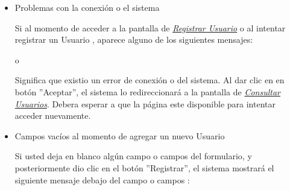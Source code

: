                 \begin{itemize}
                    \item Problemas con la conexión o el sistema
                
                        Si al momento de acceder a la pantalla de \hyperlink{registrarUs}{\textit{Registrar Usuario}} o al intentar registrar un Usuario , aparece alguno de los siguientes mensajes:
                        
                        o 
                    
                        Significa que existio un error de conexión o del sistema. Al dar clic en en botón ''Aceptar'', el sistema lo redireccionará a la pantalla de \hyperlink{consultaUs}{\textit{Consultar Usuarios}}. Debera esperar a que la página este disponible para  intentar acceder nuevamente.
                    
                    \item Campos vacíos al momento de agregar un nuevo Usuario
                
                        Si usted deja en blanco algún campo o campos del formulario, y posteriormente dio clic en el botón ''Registrar'', el sistema mostrará el siguiente mensaje debajo del campo o campos :
                        	
                    

\end{itemize}

